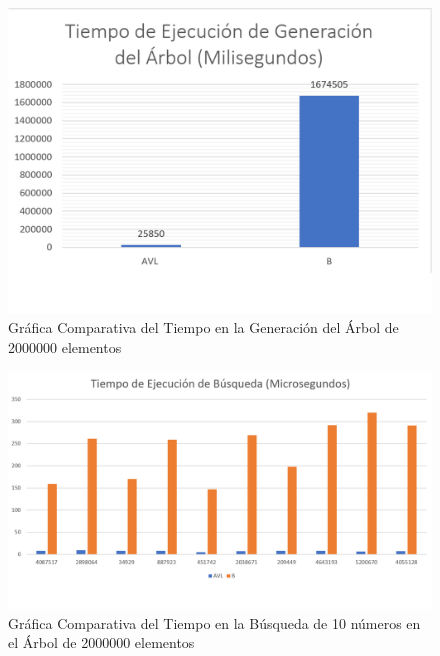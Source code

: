 \documentclass[acmsmall]{acmart}
\begin{document}
\begin{figure}[ht]
  \centering
  \caption{Gráfica Comparativa del Tiempo en la Generación del Árbol de 2000000 elementos}

  \includegraphics[angle=0,scale=0.6]{2000000.1 elem.png}
  
\end{figure}
\begin{figure}[ht]
  \centering
  \caption{Gráfica Comparativa del Tiempo en la Búsqueda de 10 números en el Árbol de 2000000 elementos}

  \includegraphics[angle=0,scale=0.53]{2000000.2 elem.png}
  
\end{figure}
\end{document}
